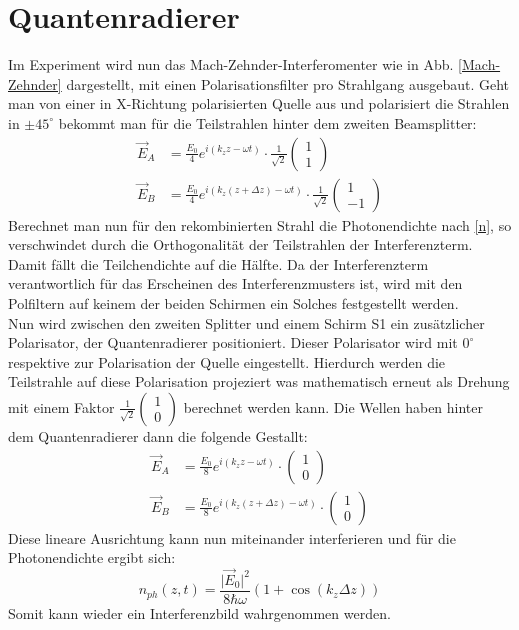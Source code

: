 \documentclass{include/thesisclass3}
\begin{document}
\section{Quantenradierer}
Im Experiment wird nun das Mach-Zehnder-Interferomenter wie in Abb. \ref{Mach-Zehnder} dargestellt, mit einen Polarisationsfilter pro Strahlgang ausgebaut. Geht man von einer in X-Richtung polarisierten Quelle aus und polarisiert die Strahlen in $\pm 45^\circ$ bekommt man für die Teilstrahlen hinter dem zweiten Beamsplitter:
\begin{align}
\vec{E}_A&=\frac{E_0}{4}e^{i(k_z z - \omega t)} \cdot\frac{1}{\sqrt{2}}\left(\begin{array}{c} 1 \\ 1 \end{array}\right)\\
\vec{E}_B&=\frac{E_0}{4}e^{i(k_z (z+\Delta z) - \omega t)}\cdot \frac{1}{\sqrt{2}}\left(\begin{array}{c} 1 \\ -1 \end{array}\right)
\end{align}
Berechnet man nun für den rekombinierten Strahl die Photonendichte nach \ref{n}, so verschwindet durch die Orthogonalität der Teilstrahlen der Interferenzterm. Damit fällt die Teilchendichte auf die Hälfte. Da der Interferenzterm verantwortlich für das Erscheinen des Interferenzmusters ist, wird mit den Polfiltern auf keinem der beiden Schirmen ein Solches festgestellt werden.\\
Nun wird zwischen den zweiten Splitter und einem Schirm S1 ein zusätzlicher Polarisator, der Quantenradierer positioniert. Dieser Polarisator wird mit $0^\circ$ respektive zur Polarisation der Quelle eingestellt. Hierdurch werden die Teilstrahle auf diese Polarisation projeziert was mathematisch erneut als Drehung mit einem Faktor $\frac{1}{\sqrt{2}}\left(\begin{array}{c} 1 \\ 0 \end{array}\right)$ berechnet werden kann. Die Wellen haben hinter dem Quantenradierer dann die folgende Gestallt:
\begin{align}
\vec{E}_A&=\frac{E_0}{8}e^{i(k_z z - \omega t)} \cdot\left(\begin{array}{c} 1 \\ 0 \end{array}\right)\\
\vec{E}_B&=\frac{E_0}{8}e^{i(k_z (z+\Delta z) - \omega t)}\cdot \left(\begin{array}{c} 1 \\ 0 \end{array}\right)
\end{align}
Diese lineare Ausrichtung kann nun miteinander interferieren und für die Photonendichte ergibt sich:
\begin{equation}
n_{ph}(z,t)=\frac{\vert \vec{E}_0\vert ^2}{8\hbar\omega}(1+\cos(k_z\Delta z))
\end{equation}
Somit kann wieder ein Interferenzbild wahrgenommen werden.
\end{document}
